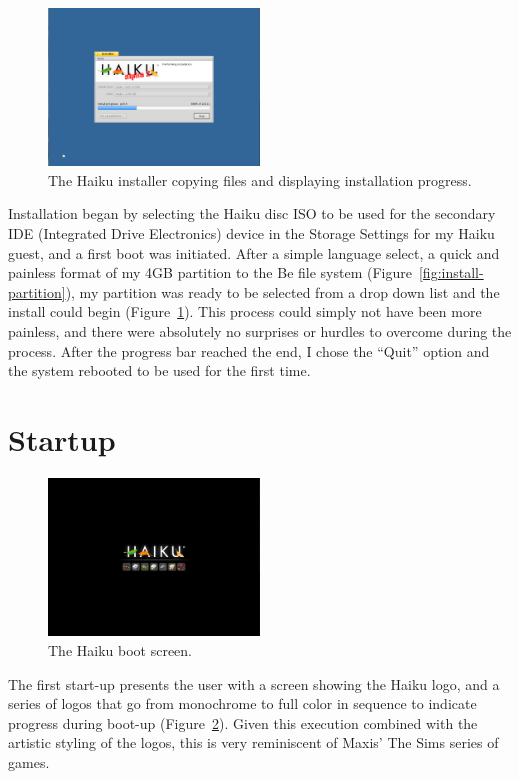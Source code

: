 \documentclass{article}
\newcommand{\figref}[1]{Figure~\ref{fig:#1}}
\begin{document}
\begin{figure}[h]
\centering
\includegraphics[width=0.5\textwidth]{figs/install-progress.png}
\caption{The Haiku installer copying files and displaying installation
  progress.}
\label{fig:install-progress}
\end{figure}

Installation began by selecting the Haiku disc ISO to be used for the
secondary IDE (Integrated Drive Electronics) device in the Storage
Settings for my Haiku guest, and a first boot was initiated.  After a
simple language select, a quick and painless format of my 4GB
partition to the Be file system (\figref{install-partition}), my
partition was ready to be selected from a drop down list and the
install could begin (\figref{install-progress}).  This process could
simply not have been more painless, and there were absolutely no
surprises or hurdles to overcome during the process.  After the
progress bar reached the end, I chose the ``Quit'' option and the
system rebooted to be used for the first time.

\section{Startup}

\begin{figure}[h]
\centering
\includegraphics[width=0.5\textwidth]{figs/startup.png}
\caption{The Haiku boot screen.}
\label{fig:startup}
\end{figure}

The first start-up presents the user with a screen showing the Haiku
logo, and a series of logos that go from monochrome to full color in
sequence to indicate progress during boot-up (\figref{startup}).
Given this execution combined with the artistic styling of the logos,
this is very reminiscent of Maxis' The Sims series of games.
\end{document}
